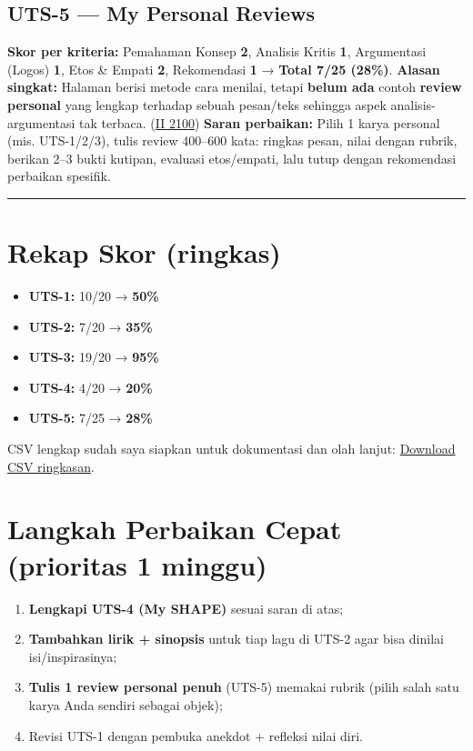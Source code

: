 \documentclass[
  letterpaper,
  DIV=11,
  numbers=noendperiod]{scrreprt}
\providecommand{\tightlist}{%
  \setlength{\itemsep}{0pt}\setlength{\parskip}{0pt}}
\begin{document}
\subsection{UTS-5 --- My Personal
Reviews}\label{uts-5-my-personal-reviews-1}

\textbf{Skor per kriteria:} Pemahaman Konsep \textbf{2}, Analisis Kritis
\textbf{1}, Argumentasi (Logos) \textbf{1}, Etos \& Empati \textbf{2},
Rekomendasi \textbf{1} → \textbf{Total 7/25 (28\%)}. \textbf{Alasan
singkat:} Halaman berisi metode cara menilai, tetapi \textbf{belum ada}
contoh \textbf{review personal} yang lengkap terhadap sebuah pesan/teks
sehingga aspek analisis-argumentasi tak terbaca.
(\href{https://ii-2100.github.io/all-about-me/My_Personal_Reviews/index.html}{II
2100}) \textbf{Saran perbaikan:} Pilih 1 karya personal (mis.
UTS-1/2/3), tulis review 400--600 kata: ringkas pesan, nilai dengan
rubrik, berikan 2--3 bukti kutipan, evaluasi etos/empati, lalu tutup
dengan rekomendasi perbaikan spesifik.

\begin{center}\rule{0.5\linewidth}{0.5pt}\end{center}

\section{Rekap Skor (ringkas)}\label{rekap-skor-ringkas}

\begin{itemize}
\tightlist
\item
  \textbf{UTS-1:} 10/20 → \textbf{50\%}
\item
  \textbf{UTS-2:} 7/20 → \textbf{35\%}
\item
  \textbf{UTS-3:} 19/20 → \textbf{95\%}
\item
  \textbf{UTS-4:} 4/20 → \textbf{20\%}
\item
  \textbf{UTS-5:} 7/25 → \textbf{28\%}
\end{itemize}

CSV lengkap sudah saya siapkan untuk dokumentasi dan olah lanjut:
\href{sandbox:/mnt/data/UTS_self_assessment.csv}{Download CSV
ringkasan}.

\section{Langkah Perbaikan Cepat (prioritas 1
minggu)}\label{langkah-perbaikan-cepat-prioritas-1-minggu}

\begin{enumerate}
\def\labelenumi{\arabic{enumi}.}
\tightlist
\item
  \textbf{Lengkapi UTS-4 (My SHAPE)} sesuai saran di atas;
\item
  \textbf{Tambahkan lirik + sinopsis} untuk tiap lagu di UTS-2 agar bisa
  dinilai isi/inspirasinya;
\item
  \textbf{Tulis 1 review personal penuh} (UTS-5) memakai rubrik (pilih
  salah satu karya Anda sendiri sebagai objek);
\item
  Revisi UTS-1 dengan pembuka anekdot + refleksi nilai diri.
\end{enumerate}
\end{document}
